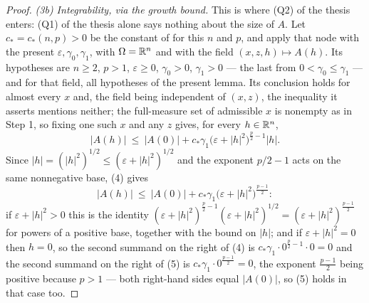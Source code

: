 \begin{proof}
\emph{(3b) Integrability, via the growth bound.}  This is where (Q2) of the thesis
enters: (Q1) of the thesis alone says nothing about the size of $A$.  Let
$c_\ast=c_\ast(n,p)>0$ be the constant of  for
this $n$ and $p$, and apply that node with the present
$\varepsilon,\gamma_0,\gamma_1$, with $\Omega=\mathbb{R}^n$ and with the field
$(x,z,h)\mapsto A(h)$.  Its hypotheses are $n\ge2$, $p>1$, $\varepsilon\ge0$,
$\gamma_0>0$, $\gamma_1>0$ --- the last from $0<\gamma_0\le\gamma_1$ --- and
 for that field, all hypotheses of the present
lemma.  Its conclusion holds for almost every $x$ and, the field being
independent of $(x,z)$, the inequality it asserts mentions neither; the
full-measure set of admissible $x$ is nonempty as in Step 1, so fixing one such
$x$ and any $z$ gives, for every $h\in\mathbb{R}^n$,
\[
|A(h)|\ \le\ |A(0)|+c_\ast\gamma_1\bigl(\varepsilon+|h|^2\bigr)^{\frac p2-1}|h| .
\tag{4}
\]
Since $|h|=(|h|^2)^{1/2}\le(\varepsilon+|h|^2)^{1/2}$ and the exponent $p/2-1$
acts on the same nonnegative base, (4) gives
\[
|A(h)|\ \le\ |A(0)|+c_\ast\gamma_1\bigl(\varepsilon+|h|^2\bigr)^{\frac{p-1}2} :
\tag{5}
\]
if $\varepsilon+|h|^2>0$ this is the identity
$(\varepsilon+|h|^2)^{\frac p2-1}(\varepsilon+|h|^2)^{1/2}
=(\varepsilon+|h|^2)^{\frac{p-1}2}$ for powers of a positive base, together
with the bound on $|h|$; and if $\varepsilon+|h|^2=0$ then $h=0$, so the second
summand on the right of (4) is $c_\ast\gamma_1\cdot0^{\frac p2-1}\cdot0=0$ and
the second summand on the right of (5) is
$c_\ast\gamma_1\cdot0^{\frac{p-1}2}=0$, the exponent $\frac{p-1}2$ being
positive because $p>1$ --- both right-hand sides equal $|A(0)|$, so (5) holds
in that case too.


\end{proof}
